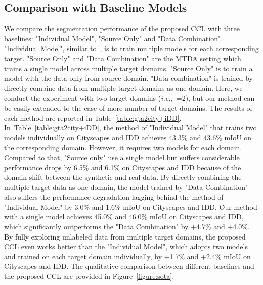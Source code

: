 \subsection{Comparison with Baseline Models}
We compare the segmentation performance of the proposed CCL with three baselines: "Individual Model", "Source Only" and "Data Combination". "Individual Model", similar to~\cite{vu2019advent}, is to train multiple models for each corresponding target. "Source Only" and "Data Combination" are the MTDA setting which trains a single model across multiple target domains. "Source Only" is to train a model with the data only from source domain. "Data combination" is trained by directly combine data from multiple target domains as one domain. Here, we conduct the experiment with two target domains (\textit{i.e.,}~=2), but our method can be easily extended to the case of more number of target domains. The results of each method are reported in Table~\ref{table:gta2city+iDD}. In~Table~\ref{table:gta2city+iDD}, the method of "Individual Model" that trains two models individually on Cityscapes and IDD achieves 43.3\% and 43.6\% mIoU on the corresponding domain. However, it requires two models for each domain. Compared to that, "Source only" use a single model but suffers considerable performance drops by 6.5\% and 6.1\% on Cityscapes and IDD because of the domain shift between the synthetic and real data. By directly combining the multiple target data as one domain, the model trained by "Data Combination" also suffers the performance degradation lagging behind the method of "Individual Model" by 3.0\% and 1.6\% mIoU on Cityscapes and IDD. Our method with a single model achieves 45.0\% and 46.0\% mIoU on Cityscapes and IDD, which significantly outperforms the "Data Combination" by +4.7\% and +4.0\%. By fully exploring unlabeled data from multiple target domains, the proposed CCL even works better than the "Individual Model", which adopts two models and trained on each target domain individually, by +1.7\% and +2.4\% mIoU on Cityscapes and IDD. The qualitative comparison between different baselines and the proposed CCL are provided in Figure~\ref{figure:sota}.


